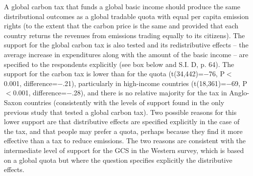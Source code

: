 A global carbon tax that funds a global basic income should produce the same distributional outcomes as a global tradable quota with equal per capita emission rights (to the extent that the carbon price is the same and provided that each country returns the revenues from emissions trading equally to its citizens). %
The support for the global carbon tax is also tested and its redistributive effects --  the average increase in expenditures along with the amount of the basic income -- are specified to the respondents explicitly  (see box below and S.I. D, p. 64). %
The support for the carbon tax is lower than for the quota (t(34,442)=$-$76, P$<$0.001, difference=$-$.21), particularly in high-income countries (t(18,361)=$-$69, P$<$0.001, difference=$-$.28), and there is no relative majority for the tax in Anglo-Saxon countries (consistently with the levels of support found in the only previous study that tested a global carbon tax\cite{carattini_how_2019}). %
Two possible reasons for this lower support are that distributive effects are specified explicitly in the case of the tax, and that people may prefer a quota, perhaps because they find it more effective than a tax to reduce emissions. The two reasons are consistent with the intermediate level of support for the GCS in the Western survey, which is based on a global quota but where the question specifies explicitly the distributive effects. %


